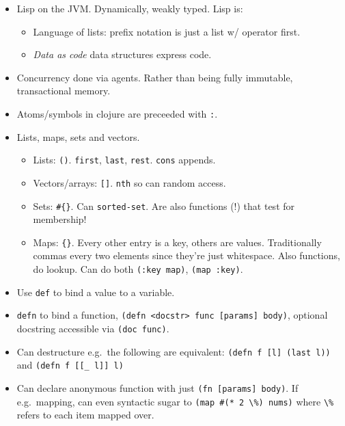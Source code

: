 \documentclass[10pt]{article}
\begin{document}
\begin{itemize}
    \item Lisp on the JVM\@. Dynamically, weakly typed. Lisp is:
        \begin{itemize}
            \item Language of lists: prefix notation is just a list w/ operator
                first.
            \item \emph{Data as code} data structures express code.
        \end{itemize}
    \item Concurrency done via agents. Rather than being fully immutable,
        transactional memory.
    \item Atoms/symbols in clojure are preceeded with \lstinline{:}.
    \item Lists, maps, sets and vectors.
        \begin{itemize}
            \item Lists: \lstinline{()}. \lstinline{first}, \lstinline{last},
                \lstinline{rest}. \lstinline{cons} appends.
            \item Vectors/arrays: \lstinline{[]}. \lstinline{nth} so can random
                access.
            \item Sets: \lstinline$#{}$. Can \lstinline{sorted-set}. Are
                also functions (!) that test for membership!
            \item Maps: \lstinline${}$. Every other entry is a key, others are
                values. Traditionally commas every two elements since they're
                just whitespace. Also functions, do lookup. Can do both
                \lstinline{(:key map)}, \lstinline{(map :key)}.
        \end{itemize}
    \item Use \lstinline{def} to bind a value to  a variable.
    \item \lstinline{defn} to bind a function,
        \lstinline{(defn <docstr> func [params] body)}, optional docstring
        accessible via \lstinline{(doc func)}.
    \item Can destructure e.g.\ the following are equivalent:
        \lstinline{(defn f [l] (last l))} and
        \lstinline{(defn f [[_ l]] l)}
    \item Can declare anonymous function with just
        \lstinline{(fn [params] body)}. If e.g.\ mapping, can even syntactic
        sugar to \lstinline{(map #(* 2 \%) nums)} where \lstinline{\%} refers to
        each item mapped over.

\end{itemize}
\end{document}
